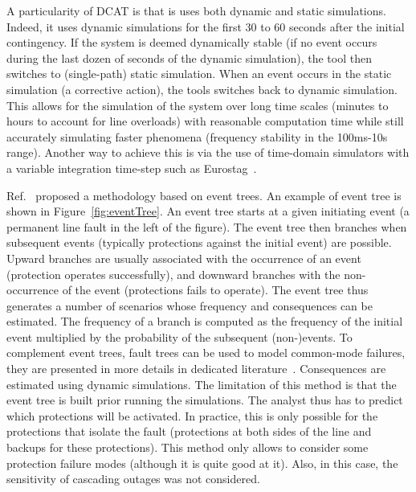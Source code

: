 A particularity of DCAT is that is uses both dynamic and static simulations. Indeed, it uses dynamic simulations for the first 30 to 60 seconds after the initial contingency. If the system is deemed dynamically stable (\ie if no event occurs during the last dozen of seconds of the dynamic simulation), the tool then switches to (single-path) static simulation. When an event occurs in the static simulation (\eg a corrective action), the tools switches back to dynamic simulation. This allows for the simulation of the system over long time scales (minutes to hours to account for \eg line overloads) with reasonable computation time while still accurately simulating faster phenomena (\eg frequency stability in the 100ms-10s range). Another way to achieve this is via the use of time-domain simulators with a variable integration time-step such as Eurostag~\cite{STAG}.

Ref.~\cite{Haarla, GridPSA} proposed a methodology based on event trees. An example of event tree is shown in Figure~\ref{fig:eventTree}. An event tree starts at a given initiating event (a permanent line fault in the left of the figure). The event tree then branches when subsequent events (typically protections against the initial event) are possible. Upward branches are usually associated with the occurrence of an event (\eg protection operates successfully), and downward branches with the non-occurrence of the event (\eg protections fails to operate). The event tree thus generates a number of scenarios whose frequency and consequences can be estimated. The frequency of a branch is computed as the frequency of the initial event multiplied by the probability of the subsequent (non-)events. To complement event trees, fault trees can be used to model common-mode failures, they are presented in more details in dedicated literature~\cite{FaultTreeHandbook}. Consequences are estimated using dynamic simulations. The limitation of this method is that the event tree is built prior running the simulations. The analyst thus has to predict which protections will be activated. In practice, this is only possible for the protections that isolate the fault (\eg protections at both sides of the line and backups for these protections). This method only allows to consider some protection failure modes (although it is quite good at it). Also, in this case, the sensitivity of cascading outages was not considered.

